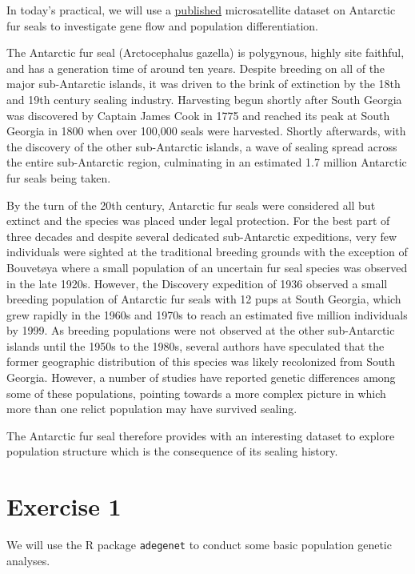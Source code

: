 \documentclass[
  letterpaper,
  DIV=11,
  numbers=noendperiod]{scrreprt}
\begin{document}
In today's practical, we will use a
\href{https://www.nature.com/articles/s41598-020-61560-8}{published}
microsatellite dataset on Antarctic fur seals to investigate gene flow
and population differentiation.

The Antarctic fur seal (Arctocephalus gazella) is polygynous, highly
site faithful, and has a generation time of around ten years. Despite
breeding on all of the major sub-Antarctic islands, it was driven to the
brink of extinction by the 18th and 19th century sealing industry.
Harvesting begun shortly after South Georgia was discovered by Captain
James Cook in 1775 and reached its peak at South Georgia in 1800 when
over 100,000 seals were harvested. Shortly afterwards, with the
discovery of the other sub-Antarctic islands, a wave of sealing spread
across the entire sub-Antarctic region, culminating in an estimated 1.7
million Antarctic fur seals being taken.

By the turn of the 20th century, Antarctic fur seals were considered all
but extinct and the species was placed under legal protection. For the
best part of three decades and despite several dedicated sub-Antarctic
expeditions, very few individuals were sighted at the traditional
breeding grounds with the exception of Bouvetøya where a small
population of an uncertain fur seal species was observed in the late
1920s. However, the Discovery expedition of 1936 observed a small
breeding population of Antarctic fur seals with 12 pups at South
Georgia, which grew rapidly in the 1960s and 1970s to reach an estimated
five million individuals by 1999. As breeding populations were not
observed at the other sub-Antarctic islands until the 1950s to the
1980s, several authors have speculated that the former geographic
distribution of this species was likely recolonized from South Georgia.
However, a number of studies have reported genetic differences among
some of these populations, pointing towards a more complex picture in
which more than one relict population may have survived sealing.

The Antarctic fur seal therefore provides with an interesting dataset to
explore population structure which is the consequence of its sealing
history.

\section{Exercise 1}\label{exercise-1}

We will use the R package \texttt{adegenet} to conduct some basic
population genetic analyses.
\end{document}
